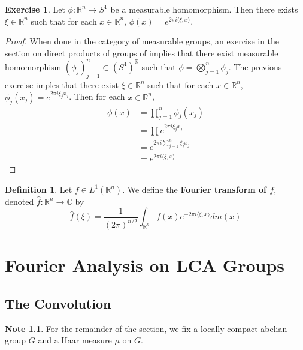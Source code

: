 \documentclass{book}
\theoremstyle{definition}
\newtheorem{defn}[definition]{Definition}
\newtheorem{note}[definition]{Note}
\newtheorem{ex}[definition]{Exercise}
\newcommand{\C}{\mathbb{C}}
\newcommand{\R}{\mathbb{R}}
\newcommand{\lex}[1]{\label{ex:#1}}
\newcommand{\ld}[1]{\label{defn:#1}}
\DeclareMathOperator*{\0}{\mbf{0}}
\DeclareMathOperator*{\1}{\mbf{1}}
\renewcommand{\r}{\rangle}
\renewcommand{\l}{\langle}
\begin{document}
	\begin{ex}
	\lex{301} Let $\phi: \R^n \rightarrow S^1$ be a measurable homomorphism. Then there exists $\xi \in \R^n$ such that for each $x \in \R^n$, $\phi(x) = e^{2 \pi i \l \xi, x\r}$. 
	\end{ex}	
	
	\begin{proof}
	When done in the category of measurable groups, an exercise in the section on direct products of groups of \cite{groups}
	implies that there exist measurable homomorphism $(\phi_{j})_{j=1}^n \subset (S^1)^{\R}$ such that $\phi = \bigotimes_{j=1}^n \phi_j$. The previous exercise imples that there exist $\xi \in \R^n$ such that for each $x \in \R^n$, $\phi_j(x_j) = e^{2 \pi i \xi_j x_j}$. Then for each $x \in \R^n$, 
	\begin{align*}
	\phi(x)
	&= \prod_{j=1}^n \phi_j(x_j) \\
	&= \prod e^{2 \pi i \xi_j x_j} \\
	&= e^{2 \pi i \sum\limits_{j=1}^n  \xi_j x_j }\\
	&= e^{2 \pi i \l \xi, x \r}
	\end{align*}
	\end{proof}
	
	\begin{defn}
	\ld{302} Let $f \in L^1(\R^n)$. We define the \textbf{Fourier transform of $f$}, denoted $\hat{f}: \R^n \rightarrow \C$ by 
	$$\hat{f}(\xi) = \frac{1}{(2 \pi)^{n / 2}} \int_{\R^n} f(x) e^{- 2 \pi i \l \xi , x\r} dm(x)$$
	\end{defn}
	
	
	
	
	
	
	
	
	
	
	
	
	
	
	\newpage
	\chapter{Fourier Analysis on LCA Groups}
	
	
	

	\section{The Convolution}	
	\begin{note}
	For the remainder of the section, we fix a locally compact abelian group $G$ and a Haar measure $\mu$ on $G$. 
	\end{note}
	
\end{document}
